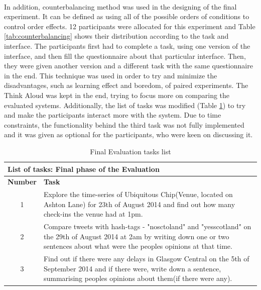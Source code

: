 \documentclass{l4proj}
\begin{document}
\paragraph{} 
In addition, counterbalancing method was used in the designing of the final experiment. It can be defined as using all of the possible orders of conditions to control order effects\cite{counterbalancing}. 12 participants were allocated for this experiment and Table \ref{tab:counterbalancing} shows their distribution according to the task and interface. The participants first had to complete a task, using one version of the interface, and then fill the questionnaire about that particular interface. Then, they were given another version and a different task with the same questionnaire in the end. This technique was used in order to try and minimize the disadvantages, such as learning effect and boredom, of paired experiments. The Think Aloud was kept in the end, trying to focus more on comparing the evaluated systems. Additionally, the list of tasks was modified (Table \ref{tab:finalevaltasks}) to try and make the participants interact more with the system. Due to time constraints, the functionality behind the third task was not fully implemented and it was given as optional for the participants, who were keen on discussing it.     

\begin{table}[H]
	\centering
	\begin{adjustbox}{width=1\textwidth}
		\begin{tabular}{|c|p{14cm}|}\hline
			\multicolumn{2}{|l|}{\textbf{List of tasks: Final phase of the Evaluation}} \\\hline
			\textbf{Number} & \textbf{Task} \\ \hline
			1
			&
			Explore the time-series of Ubiquitous Chip(Venue, located on Ashton Lane) for 23th of August 2014 and find out how many check-ins the venue had at 1pm.
			\tabularnewline\hline
			2
			&
			Compare tweets with hash-tags - "nosctoland" and "yesscotland" on the 29th of August 2014 at 2am by writing down one or two sentences about what were the people\textquotesingle s opinions at that time.
			\tabularnewline\hline
			3
			&
			Find out if there were any delays in Glasgow Central on the 5th of September 2014 and if there were, write down a sentence, summarising people\textquotesingle s opinions about them(if there were any).
			\tabularnewline\hline
		\end{tabular}
	\end{adjustbox}
	\caption{Final Evaluation tasks list}
	\label{tab:finalevaltasks}
\end{table}
\end{document}
